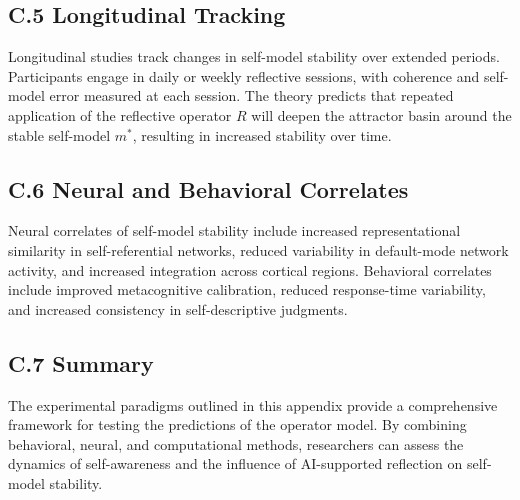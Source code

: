 \documentclass[12pt]{article}
\begin{document}
\subsection*{C.5 Longitudinal Tracking}

Longitudinal studies track changes in self-model stability over extended periods. Participants engage in daily or weekly reflective sessions, with coherence and self-model error measured at each session. The theory predicts that repeated application of the reflective operator $R$ will deepen the attractor basin around the stable self-model $m^*$, resulting in increased stability over time.

\subsection*{C.6 Neural and Behavioral Correlates}

Neural correlates of self-model stability include increased representational similarity in self-referential networks, reduced variability in default-mode network activity, and increased integration across cortical regions. Behavioral correlates include improved metacognitive calibration, reduced response-time variability, and increased consistency in self-descriptive judgments.

\subsection*{C.7 Summary}

The experimental paradigms outlined in this appendix provide a comprehensive framework for testing the predictions of the operator model. By combining behavioral, neural, and computational methods, researchers can assess the dynamics of self-awareness and the influence of AI-supported reflection on self-model stability.

\end{document}
